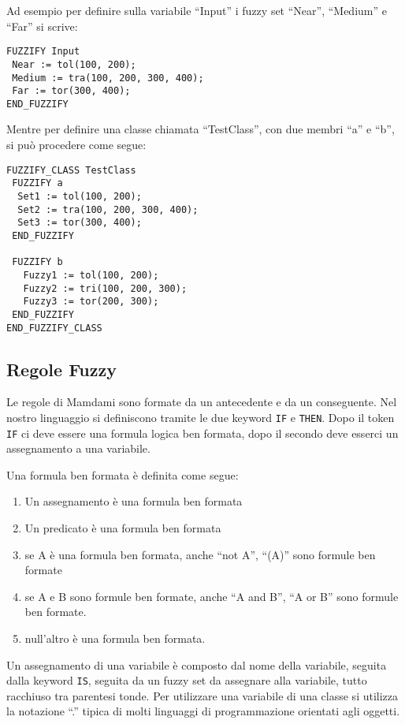 Ad esempio per definire sulla variabile ``Input'' i fuzzy set ``Near'', ``Medium'' e ``Far'' si scrive:

\begin{verbatim}
FUZZIFY Input
 Near := tol(100, 200);
 Medium := tra(100, 200, 300, 400);
 Far := tor(300, 400);
END_FUZZIFY
\end{verbatim}

Mentre per definire una classe chiamata ``TestClass'', con due membri ``a'' e ``b'', si può procedere come segue:


\begin{verbatim}
FUZZIFY_CLASS TestClass
 FUZZIFY a
  Set1 := tol(100, 200);
  Set2 := tra(100, 200, 300, 400);
  Set3 := tor(300, 400);
 END_FUZZIFY
 
 FUZZIFY b
   Fuzzy1 := tol(100, 200);
   Fuzzy2 := tri(100, 200, 300);
   Fuzzy3 := tor(200, 300);
 END_FUZZIFY
END_FUZZIFY_CLASS
\end{verbatim}


\subsection{Regole Fuzzy}
Le regole di Mamdami sono formate da un antecedente e da un conseguente. Nel nostro linguaggio si definiscono tramite le due keyword \verb|IF| e \verb|THEN|.
Dopo il token \verb|IF| ci deve essere una formula logica ben formata, dopo il secondo deve esserci un assegnamento a una variabile.

Una formula ben formata è definita come segue:
\begin{enumerate}
 \item Un assegnamento è una formula ben formata
 \item Un predicato è una formula ben formata
 \item se A è una formula ben formata, anche ``not A'', ``(A)'' sono formule ben formate
 \item se A e B sono formule ben formate, anche ``A and B'', ``A or B'' sono formule ben formate.
 \item null'altro è una formula ben formata.
\end{enumerate}

Un assegnamento di una variabile è composto dal nome della variabile, seguita dalla keyword \verb|IS|, seguita da un fuzzy set da assegnare alla variabile, tutto racchiuso tra parentesi tonde. Per utilizzare una variabile di una classe si utilizza la notazione ``.'' tipica di molti linguaggi di programmazione orientati agli oggetti.

